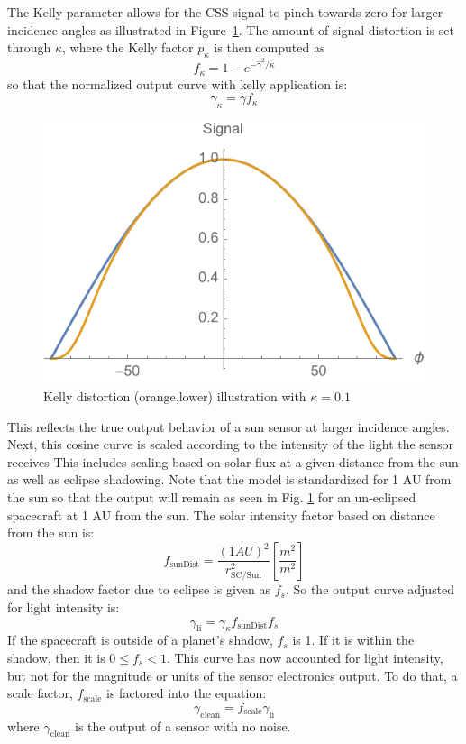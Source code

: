 The Kelly parameter allows for the CSS signal to pinch towards zero for larger incidence angles as illustrated in Figure~\ref{fig:kelly}.  The amount of signal distortion is set through $\kappa$, where the Kelly factor $p_{\kappa}$ is then computed as 
\begin{equation}
f_{\kappa} = 1 - e^{-\hat\gamma^{2}/\kappa}
\end{equation}
so that the normalized output curve with kelly application is:
\begin{equation}
\gamma_{\kappa} = \gamma f_{\kappa}
\end{equation}
\begin{figure}[htb]
	\centerline{
		\includegraphics[]{Figures/kelly}
	}
	\caption{Kelly distortion (orange,lower) illustration with $\kappa = 0.1$}
	\label{fig:kelly}
\end{figure}
This reflects the true output behavior of a sun sensor at larger incidence angles. Next, this cosine curve is scaled according to the intensity of the light the sensor receives This includes scaling based on solar flux at a given distance from the sun as well as eclipse shadowing. Note that the model is standardized for 1 AU from the sun so that the output will remain as seen in Fig. \ref{fig:kelly} for an un-eclipsed spacecraft at 1 AU from the sun.
The solar intensity factor based on distance from the sun is:
\begin{equation}
	f_{\mathrm{sunDist}} = \frac{(1 AU)^2}{r_\mathrm{SC/Sun}^2} [\frac{m^2}{m^2}]
\end{equation}
and the shadow factor due to eclipse is given as $f_s$. So the output curve adjusted for light intensity is:
\begin{equation}
	\gamma_{\textrm{li}} = \gamma_{\kappa} f_{\mathrm{sunDist}} f_s 
\end{equation}
If the spacecraft is outside of a planet's shadow, $f_s$ is 1.  If it is within the shadow, then it is $0\le f_{s} < 1$. 
This curve has now accounted for light intensity, but not for the magnitude or units of the sensor electronics output. To do that, a scale factor, $f_{\mathrm{scale}}$ is factored into the equation:
\begin{equation}
	\gamma_{\mathrm{clean}} = f_{\mathrm{scale}} \gamma_{\textrm{li}}
\end{equation}
where $\gamma_{\mathrm{clean}}$ is the output of a sensor with no noise.


